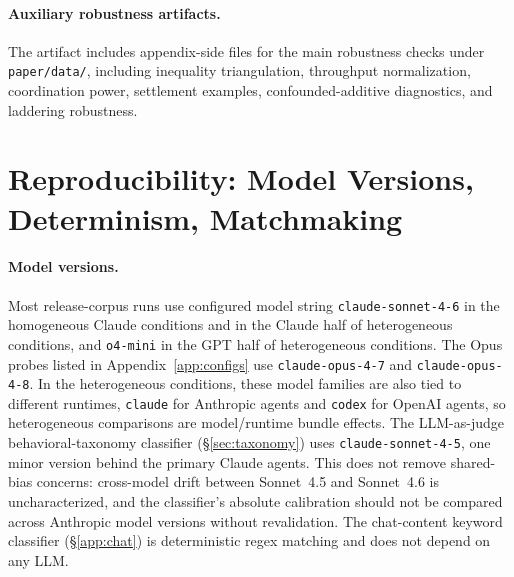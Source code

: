 \documentclass{article}
\begin{document}
\paragraph{Auxiliary robustness artifacts.}
The artifact includes appendix-side files for the main robustness checks under \texttt{paper/data/}, including inequality triangulation, throughput normalization, coordination power, settlement examples, confounded-additive diagnostics, and laddering robustness.

\section{Reproducibility: Model Versions, Determinism, Matchmaking}
\label{app:reproducibility}

\paragraph{Model versions.}
Most release-corpus runs use configured model string \texttt{claude-sonnet-4-6} in the homogeneous Claude conditions and in the Claude half of heterogeneous conditions, and \texttt{o4-mini} in the GPT half of heterogeneous conditions. The Opus probes listed in Appendix~\ref{app:configs} use \texttt{claude-opus-4-7} and \texttt{claude-opus-4-8}.
In the heterogeneous conditions, these model families are also tied to different runtimes, \texttt{claude} for Anthropic agents and \texttt{codex} for OpenAI agents, so heterogeneous comparisons are model/runtime bundle effects.
The LLM-as-judge behavioral-taxonomy classifier (\S\ref{sec:taxonomy}) uses \texttt{claude-sonnet-4-5}, one minor version behind the primary Claude agents.
This does not remove shared-bias concerns: cross-model drift between Sonnet~4.5 and Sonnet~4.6 is uncharacterized, and the classifier's absolute calibration should not be compared across Anthropic model versions without revalidation.
The chat-content keyword classifier (\S\ref{app:chat}) is deterministic regex matching and does not depend on any LLM.
\end{document}

